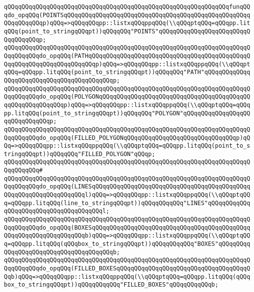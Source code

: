 \newline
\verb|qQQqqQQqqQQqqQQqqQQqqQQqqQQqqQQqqQQqqQQqqQQqqQQqqQQqqQQqqQQqqQQqfunqQQqdo_opqQQq(POINTSqQQqqQQqqQQqqQQqqQQqqQQqqQQqqQQqqQQqqQQqqQQqqQQqqQQqqQQqqQQqqQQqp)qQQq=>qQQqqQQqpp::listxqQQqppqQQq(\\qQQqptqQQq=qQQqpp.litqQQq(point_to_stringqQQqpt))qQQqqQQq"POINTS"qQQqqQQqqQQqqQQqqQQqqQQqqQQqqQQqqQQqp;|\newline
\verb|qQQqqQQqqQQqqQQqqQQqqQQqqQQqqQQqqQQqqQQqqQQqqQQqqQQqqQQqqQQqqQQqqQQqqQQqqQQqqQQqdo_opqQQq(PATHqQQqqQQqqQQqqQQqqQQqqQQqqQQqqQQqqQQqqQQqqQQqqQQqqQQqqQQqqQQqqQQqqQQqqQQqp)qQQq=>qQQqqQQqpp::listxqQQqppqQQq(\\qQQqptqQQq=qQQqpp.litqQQq(point_to_stringqQQqpt))qQQqqQQq"PATH"qQQqqQQqqQQqqQQqqQQqqQQqqQQqqQQqqQQqqQQqqQQqp;|\newline
\verb|qQQqqQQqqQQqqQQqqQQqqQQqqQQqqQQqqQQqqQQqqQQqqQQqqQQqqQQqqQQqqQQqqQQqqQQqqQQqqQQqdo_opqQQq(POLYGONqQQqqQQqqQQqqQQqqQQqqQQqqQQqqQQqqQQqqQQqqQQqqQQqqQQqqQQqqQQqp)qQQq=>qQQqqQQqpp::listxqQQqppqQQq(\\qQQqptqQQq=qQQqpp.litqQQq(point_to_stringqQQqpt))qQQqqQQq"POLYGON"qQQqqQQqqQQqqQQqqQQqqQQqqQQqqQQqp;|\newline
\verb|qQQqqQQqqQQqqQQqqQQqqQQqqQQqqQQqqQQqqQQqqQQqqQQqqQQqqQQqqQQqqQQqqQQqqQQqqQQqqQQqdo_opqQQq(FILLED_POLYGONqQQqqQQqqQQqqQQqqQQqqQQqqQQqqQQqp)qQQq=>qQQqqQQqpp::listxqQQqppqQQq(\\qQQqptqQQq=qQQqpp.litqQQq(point_to_stringqQQqpt))qQQqqQQq"FILLED_POLYGON"qQQqp;|\newline
\verb|qQQqqQQqqQQqqQQqqQQqqQQqqQQqqQQqqQQqqQQqqQQqqQQqqQQqqQQqqQQqqQQqqQQqqQQqqQQqqQQq#|\newline
\verb|qQQqqQQqqQQqqQQqqQQqqQQqqQQqqQQqqQQqqQQqqQQqqQQqqQQqqQQqqQQqqQQqqQQqqQQqqQQqqQQqdo_opqQQq(LINESqQQqqQQqqQQqqQQqqQQqqQQqqQQqqQQqqQQqqQQqqQQqqQQqqQQqqQQqqQQqqQQqqQQql)qQQq=>qQQqqQQqpp::listxqQQqppqQQq(\\qQQqptqQQq=qQQqpp.litqQQq(line_to_stringqQQqpt))qQQqqQQqqQQq"LINES"qQQqqQQqqQQqqQQqqQQqqQQqqQQqqQQqqQQqqQQql;|\newline
\verb|qQQqqQQqqQQqqQQqqQQqqQQqqQQqqQQqqQQqqQQqqQQqqQQqqQQqqQQqqQQqqQQqqQQqqQQqqQQqqQQqdo_opqQQq(BOXESqQQqqQQqqQQqqQQqqQQqqQQqqQQqqQQqqQQqqQQqqQQqqQQqqQQqqQQqqQQqqQQqqQQqb)qQQq=>qQQqqQQqpp::listxqQQqppqQQq(\\qQQqptqQQq=qQQqpp.litqQQq(qQQqbox_to_stringqQQqpt))qQQqqQQqqQQq"BOXES"qQQqqQQqqQQqqQQqqQQqqQQqqQQqqQQqqQQqqQQqb;|\newline
\verb|qQQqqQQqqQQqqQQqqQQqqQQqqQQqqQQqqQQqqQQqqQQqqQQqqQQqqQQqqQQqqQQqqQQqqQQqqQQqqQQqdo_opqQQq(FILLED_BOXESqQQqqQQqqQQqqQQqqQQqqQQqqQQqqQQqqQQqqQQqb)qQQq=>qQQqqQQqpp::listxqQQqppqQQq(\\qQQqptqQQq=qQQqpp.litqQQq(qQQqbox_to_stringqQQqpt))qQQqqQQqqQQq"FILLED_BOXES"qQQqqQQqqQQqb;|\newline
